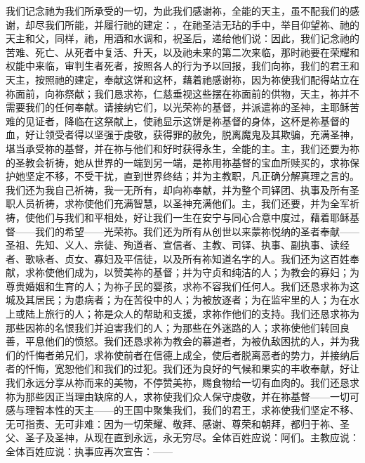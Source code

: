 我们记念祂为我们所承受的一切，为此我们感谢祢，全能的天主，虽不配我们的感谢，却尽我们所能，并履行祂的建定：，在祂圣洁无玷的手中，举目仰望祢、祂的天主和父，同样，祂，用酒和水调和，祝圣后，递给他们说：因此，我们记念祂的苦难、死亡、从死者中复活、升天，以及祂未来的第二次来临，那时祂要在荣耀和权能中来临，审判生者死者，按照各人的行为予以回报，我们向祢，我们的君王和天主，按照祂的建定，奉献这饼和这杯，藉着祂感谢祢，因为祢使我们配得站立在祢面前，向祢祭献；我们恳求祢，仁慈垂视这些摆在祢面前的供物，天主，祢并不需要我们的任何奉献。请接纳它们，以光荣祢的基督，并派遣祢的圣神，主耶稣苦难的见证者，降临在这祭献上，使祂显示这饼是祢基督的身体，这杯是祢基督的血，好让领受者得以坚强于虔敬，获得罪的赦免，脱离魔鬼及其欺骗，充满圣神，堪当承受祢的基督，并在祢与他们和好时获得永生，全能的主。主，我们还要为祢的圣教会祈祷，她从世界的一端到另一端，是祢用祢基督的宝血所赎买的，求祢保护她坚定不移，不受干扰，直到世界终结；并为主教职，凡正确分解真理之言的。我们还为我自己祈祷，我一无所有，却向祢奉献，并为整个司铎团、执事及所有圣职人员祈祷，求祢使他们充满智慧，以圣神充满他们。主，我们还要，并为全军祈祷，使他们与我们和平相处，好让我们一生在安宁与同心合意中度过，藉着耶稣基督——我们的希望——光荣祢。我们还为所有从创世以来蒙祢悦纳的圣者奉献——圣祖、先知、义人、宗徒、殉道者、宣信者、主教、司铎、执事、副执事、读经者、歌咏者、贞女、寡妇及平信徒，以及所有祢知道名字的人。我们还为这百姓奉献，求祢使他们成为，以赞美祢的基督；并为守贞和纯洁的人；为教会的寡妇；为尊贵婚姻和生育的人；为祢子民的婴孩，求祢不容我们任何人。我们还恳求祢为这城及其居民；为患病者；为在苦役中的人；为被放逐者；为在监牢里的人；为在水上或陆上旅行的人；祢是众人的帮助和支援，求祢作他们的支持。我们还恳求祢为那些因祢的名恨我们并迫害我们的人；为那些在外迷路的人；求祢使他们转回良善，平息他们的愤怒。我们还恳求祢为教会的慕道者，为被仇敌困扰的人，并为我们的忏悔者弟兄们，求祢使前者在信德上成全，使后者脱离恶者的势力，并接纳后者的忏悔，宽恕他们和我们的过犯。我们还为良好的气候和果实的丰收奉献，好让我们永远分享从祢而来的美物，不停赞美祢，赐食物给一切有血肉的。我们还恳求祢为那些因正当理由缺席的人，求祢使我们众人保守虔敬，并在祢基督——一切可感与理智本性的天主——的王国中聚集我们，我们的君王，求祢使我们坚定不移、无可指责、无可非难：因为一切荣耀、敬拜、感谢、尊荣和朝拜，都归于祢、圣父、圣子及圣神，从现在直到永远，永无穷尽。全体百姓应说：阿们。主教应说：全体百姓应说：执事应再次宣告：——\par

